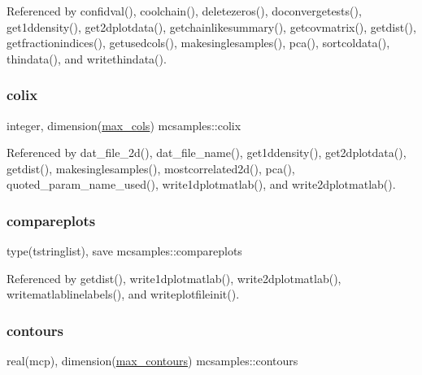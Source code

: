 Referenced by confidval(), coolchain(), deletezeros(), doconvergetests(), get1ddensity(), get2dplotdata(), getchainlikesummary(), getcovmatrix(), getdist(), getfractionindices(), getusedcols(), makesinglesamples(), pca(), sortcoldata(), thindata(), and writethindata().

\mbox{\label{namespacemcsamples_a16ed6273b18cc5caae328b4524db8061}} 
\subsubsection{\texorpdfstring{colix}{colix}}
{\footnotesize\ttfamily integer, dimension(\mbox{\hyperlink{namespacemcsamples_ae8386bad918d8af8d203683c01d5818c}{max\+\_\+cols}}) mcsamples\+::colix}



Referenced by dat\+\_\+file\+\_\+2d(), dat\+\_\+file\+\_\+name(), get1ddensity(), get2dplotdata(), getdist(), makesinglesamples(), mostcorrelated2d(), pca(), quoted\+\_\+param\+\_\+name\+\_\+used(), write1dplotmatlab(), and write2dplotmatlab().

\mbox{\label{namespacemcsamples_a69983643fd9f3aed82247d3eb19d8ba0}} 
\subsubsection{\texorpdfstring{compareplots}{compareplots}}
{\footnotesize\ttfamily type(tstringlist), save mcsamples\+::compareplots}



Referenced by getdist(), write1dplotmatlab(), write2dplotmatlab(), writematlablinelabels(), and writeplotfileinit().

\mbox{\label{namespacemcsamples_ae745525f8fef6e02d22826cd2a5f1bcc}} 
\subsubsection{\texorpdfstring{contours}{contours}}
{\footnotesize\ttfamily real(mcp), dimension(\mbox{\hyperlink{namespacemcsamples_a878ea2f4d47feda9ed7a1701aabfb0d1}{max\+\_\+contours}}) mcsamples\+::contours}



